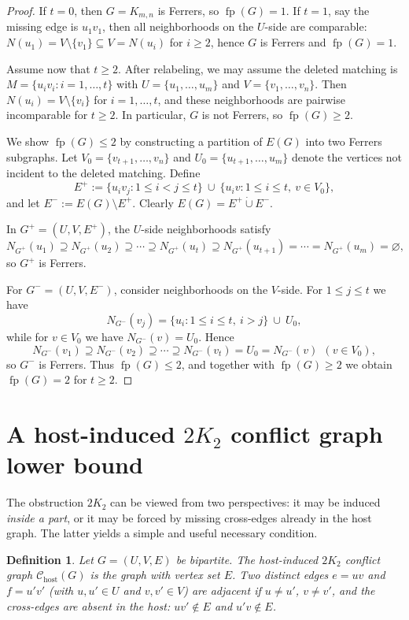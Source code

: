 \documentclass[12pt]{amsart}
\newtheorem{definition}[theorem]{Definition}
\newcommand{\fp}{\operatorname{fp}}
\begin{document}
\begin{proof}
If $t=0$, then $G=K_{m,n}$ is Ferrers, so $\fp(G)=1$.
If $t=1$, say the missing edge is $u_1v_1$, then all neighborhoods on the $U$-side are comparable:
$N(u_1)=V\setminus\{v_1\}\subseteq V=N(u_i)$ for $i\ge 2$, hence $G$ is Ferrers and $\fp(G)=1$.

Assume now that $t\ge 2$.
After relabeling, we may assume the deleted matching is
$M=\{u_iv_i: i=1,\dots,t\}$ with $U=\{u_1,\dots,u_m\}$ and $V=\{v_1,\dots,v_n\}$.
Then $N(u_i)=V\setminus\{v_i\}$ for $i=1,\dots,t$, and these neighborhoods are pairwise incomparable for $t\ge 2$.
In particular, $G$ is not Ferrers, so $\fp(G)\ge 2$.

We show $\fp(G)\le 2$ by constructing a partition of $E(G)$ into two Ferrers subgraphs.
Let $V_0=\{v_{t+1},\dots,v_n\}$ and $U_0=\{u_{t+1},\dots,u_m\}$ denote the vertices not incident to the deleted matching.
Define
\[
E^+ := \{u_i v_j : 1\le i<j\le t\}\ \cup\ \{u_i v : 1\le i\le t,\ v\in V_0\},
\]
and let $E^-:=E(G)\setminus E^+$.
Clearly $E(G)=E^+\dot\cup E^-$.

In $G^+=(U,V,E^+)$, the $U$-side neighborhoods satisfy
\[
N_{G^+}(u_1)\supseteq N_{G^+}(u_2)\supseteq\cdots\supseteq N_{G^+}(u_t)\supseteq
N_{G^+}(u_{t+1})=\cdots=N_{G^+}(u_m)=\varnothing,
\]
so $G^+$ is Ferrers.

For $G^-=(U,V,E^-)$, consider neighborhoods on the $V$-side.
For $1\le j\le t$ we have
\[
N_{G^-}(v_j)=\{u_i: 1\le i\le t,\ i>j\}\ \cup\ U_0,
\]
while for $v\in V_0$ we have $N_{G^-}(v)=U_0$.
Hence
\[
N_{G^-}(v_1)\supseteq N_{G^-}(v_2)\supseteq\cdots\supseteq N_{G^-}(v_t)=U_0
= N_{G^-}(v)\ \ (v\in V_0),
\]
so $G^-$ is Ferrers.
Thus $\fp(G)\le 2$, and together with $\fp(G)\ge 2$ we obtain $\fp(G)=2$ for $t\ge 2$.
\end{proof}


\section{A host-induced $2K_2$ conflict graph lower bound}\label{sec:conflict}

The obstruction $2K_2$ can be viewed from two perspectives: it may be induced \emph{inside a part}, or it may be forced by missing cross-edges already in the host graph.
The latter yields a simple and useful necessary condition.

\begin{definition}
Let $G=(U,V,E)$ be bipartite. The \emph{host-induced $2K_2$ conflict graph} $\mathcal C_{\mathrm{host}}(G)$ is the graph with vertex set $E$.
Two distinct edges $e=uv$ and $f=u'v'$ (with $u,u'\in U$ and $v,v'\in V$) are adjacent if
$u\neq u'$, $v\neq v'$, and the cross-edges are \emph{absent in the host}:
$uv'\notin E$ and $u'v\notin E$.
\end{definition}
\end{document}
